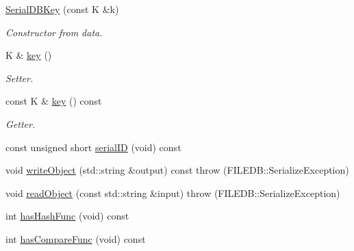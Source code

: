 \begin{DoxyCompactItemize}
\mbox{\hyperlink{classADATIO_1_1SerialDBKey_ad035f1ac5d8565aec4e5a7197333123f}{Serial\+D\+B\+Key}} (const K \&k)
\begin{DoxyCompactList}\small\item\em Constructor from data. \end{DoxyCompactList}\item 
K \& \mbox{\hyperlink{classADATIO_1_1SerialDBKey_a9dc566bd8bc83d98d4438d220012648a}{key}} ()
\begin{DoxyCompactList}\small\item\em Setter. \end{DoxyCompactList}\item 
const K \& \mbox{\hyperlink{classADATIO_1_1SerialDBKey_a89514c7decfe6ee0573032faff49703a}{key}} () const
\begin{DoxyCompactList}\small\item\em Getter. \end{DoxyCompactList}\item 
const unsigned short \mbox{\hyperlink{classADATIO_1_1SerialDBKey_a0d088e08f453fd38a906208783f788d7}{serial\+ID}} (void) const
\item 
void \mbox{\hyperlink{classADATIO_1_1SerialDBKey_a6e2d9bbd18a3fa5e049f0ad5321d328a}{write\+Object}} (std\+::string \&output) const  throw (\+F\+I\+L\+E\+D\+B\+::\+Serialize\+Exception)
\item 
void \mbox{\hyperlink{classADATIO_1_1SerialDBKey_a10b5c24f2529bac1df4c4603c2caf551}{read\+Object}} (const std\+::string \&input)  throw (\+F\+I\+L\+E\+D\+B\+::\+Serialize\+Exception)
\item 
int \mbox{\hyperlink{classADATIO_1_1SerialDBKey_ae8926cd9bdef006f3729f4b724a2e2fe}{has\+Hash\+Func}} (void) const
\item 
int \mbox{\hyperlink{classADATIO_1_1SerialDBKey_a2f28d2ac39919d9cb9f6fc097944c49c}{has\+Compare\+Func}} (void) const
\end{DoxyCompactItemize}
